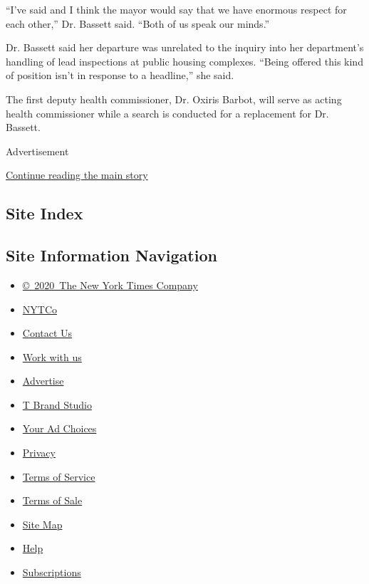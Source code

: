 ``I've said and I think the mayor would say that we have enormous
respect for each other,'' Dr. Bassett said. ``Both of us speak our
minds.''

Dr. Bassett said her departure was unrelated to the inquiry into her
department's handling of lead inspections at public housing complexes.
``Being offered this kind of position isn't in response to a headline,''
she said.

The first deputy health commissioner, Dr. Oxiris Barbot, will serve as
acting health commissioner while a search is conducted for a replacement
for Dr. Bassett.

Advertisement

\protect\hyperlink{after-bottom}{Continue reading the main story}

\hypertarget{site-index}{%
\subsection{Site Index}\label{site-index}}

\hypertarget{site-information-navigation}{%
\subsection{Site Information
Navigation}\label{site-information-navigation}}

\begin{itemize}
\tightlist
\item
  \href{https://help.nytimes3xbfgragh.onion/hc/en-us/articles/115014792127-Copyright-notice}{©~2020~The
  New York Times Company}
\end{itemize}

\begin{itemize}
\tightlist
\item
  \href{https://www.nytco.com/}{NYTCo}
\item
  \href{https://help.nytimes3xbfgragh.onion/hc/en-us/articles/115015385887-Contact-Us}{Contact
  Us}
\item
  \href{https://www.nytco.com/careers/}{Work with us}
\item
  \href{https://nytmediakit.com/}{Advertise}
\item
  \href{http://www.tbrandstudio.com/}{T Brand Studio}
\item
  \href{https://www.nytimes3xbfgragh.onion/privacy/cookie-policy\#how-do-i-manage-trackers}{Your
  Ad Choices}
\item
  \href{https://www.nytimes3xbfgragh.onion/privacy}{Privacy}
\item
  \href{https://help.nytimes3xbfgragh.onion/hc/en-us/articles/115014893428-Terms-of-service}{Terms
  of Service}
\item
  \href{https://help.nytimes3xbfgragh.onion/hc/en-us/articles/115014893968-Terms-of-sale}{Terms
  of Sale}
\item
  \href{https://spiderbites.nytimes3xbfgragh.onion}{Site Map}
\item
  \href{https://help.nytimes3xbfgragh.onion/hc/en-us}{Help}
\item
  \href{https://www.nytimes3xbfgragh.onion/subscription?campaignId=37WXW}{Subscriptions}
\end{itemize}

